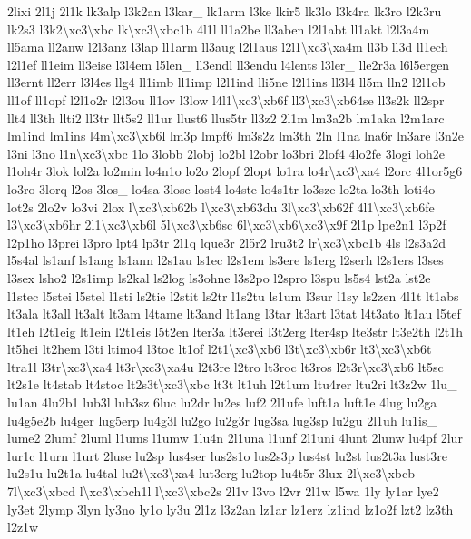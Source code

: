{2lixi 2l1j 2l1k lk3alp l3k2an l3kar\-\_\- lk1arm l3ke lkir5 lk3lo l3k4ra lk3ro l2k3ru lk2s3 l3k2\textbackslash{}xc3\textbackslash{}xbc lk\textbackslash{}xc3\textbackslash{}xbc1b 4l1l ll1a2be ll3aben l2l1abt ll1akt l2l3a4m ll5ama ll2anw l2l3anz l3lap ll1arm ll3aug l2l1aus l2l1\textbackslash{}xc3\textbackslash{}xa4m ll3b ll3d ll1ech l2l1ef ll1eim ll3eise l3l4em l5len\-\_\- ll3endl ll3endu l4lents l3ler\-\_\- lle2r3a l6l5ergen ll3ernt ll2err l3l4es llg4 ll1imb ll1imp l2l1ind lli5ne l2l1ins ll3l4 ll5m lln2 l2l1ob ll1of ll1opf l2l1o2r l2l3ou ll1ov l3low l4l1\textbackslash{}xc3\textbackslash{}xb6f ll3\textbackslash{}xc3\textbackslash{}xb64se ll3s2k ll2spr llt4 ll3th llti2 ll3tr llt5s2 ll1ur llust6 llus5tr ll3z2 2l1m lm3a2b lm1aka l2m1arc lm1ind lm1ins l4m\textbackslash{}xc3\textbackslash{}xb6l lm3p lmpf6 lm3s2z lm3th 2ln l1na lna6r ln3are l3n2e l3ni l3no l1n\textbackslash{}xc3\textbackslash{}xbc 1lo 3lobb 2lobj lo2bl l2obr lo3bri 2lof4 4lo2fe 3logi loh2e l1oh4r 3lok lol2a lo2min lo4n1o lo2o 2lopf 2lopt lo1ra lo4r\textbackslash{}xc3\textbackslash{}xa4 l2orc 4l1or5g6 lo3ro 3lorq l2os 3los\-\_\- lo4sa 3lose lost4 lo4ste lo4s1tr lo3sze lo2ta lo3th loti4o lot2s 2lo2v lo3vi 2lox l\textbackslash{}xc3\textbackslash{}xb62b l\textbackslash{}xc3\textbackslash{}xb63du 3l\textbackslash{}xc3\textbackslash{}xb62f 4l1\textbackslash{}xc3\textbackslash{}xb6fe l3\textbackslash{}xc3\textbackslash{}xb6hr 2l1\textbackslash{}xc3\textbackslash{}xb6l 5l\textbackslash{}xc3\textbackslash{}xb6sc 6l\textbackslash{}xc3\textbackslash{}xb6\textbackslash{}xc3\textbackslash{}x9f 2l1p lpe2n1 l3p2f l2p1ho l3prei l3pro lpt4 lp3tr 2l1q lque3r 2l5r2 lru3t2 lr\textbackslash{}xc3\textbackslash{}xbc1b 4ls l2s3a2d l5s4al ls1anf ls1ang ls1ann l2s1au ls1ec l2s1em ls3ere ls1erg l2serh l2s1ers l3ses l3sex lsho2 l2s1imp ls2kal ls2log ls3ohne l3s2po l2spro l3spu ls5s4 lst2a lst2e l1stec l5stei l5stel l1sti ls2tie l2stit ls2tr l1s2tu ls1um l3sur l1sy ls2zen 4l1t lt1abs lt3ala lt3all lt3alt lt3am l4tame lt3and lt1ang l3tar lt3art l3tat l4t3ato lt1au l5tef lt1eh l2t1eig lt1ein l2t1eis l5t2en lter3a lt3erei l3t2erg lter4sp lte3str lt3e2th l2t1h lt5hei lt2hem l3ti ltimo4 l3toc lt1of l2t1\textbackslash{}xc3\textbackslash{}xb6 l3t\textbackslash{}xc3\textbackslash{}xb6r lt3\textbackslash{}xc3\textbackslash{}xb6t ltra1l l3tr\textbackslash{}xc3\textbackslash{}xa4 lt3r\textbackslash{}xc3\textbackslash{}xa4u l2t3re l2tro lt3roc lt3ros l2t3r\textbackslash{}xc3\textbackslash{}xb6 lt5sc lt2s1e lt4stab lt4stoc lt2s3t\textbackslash{}xc3\textbackslash{}xbc lt3t lt1uh l2t1um ltu4rer ltu2ri lt3z2w 1lu\-\_\- lu1an 4lu2b1 lub3l lub3sz 6luc lu2dr lu2es luf2 2l1ufe luft1a luft1e 4lug lu2ga lu4g5e2b lu4ger lug5erp lu4g3l lu2go lu2g3r lug3sa lug3sp lu2gu 2l1uh lu1is\-\_\- lume2 2lumf 2luml l1ums l1umw 1lu4n 2l1una l1unf 2l1uni 4lunt 2lunw lu4pf 2lur lur1c l1urn l1urt 2luse lu2sp lus4ser lus2s1o lus2s3p lus4st lu2st lus2t3a lust3re lu2s1u lu2t1a lu4tal lu2t\textbackslash{}xc3\textbackslash{}xa4 lut3erg lu2top lu4t5r 3lux 2l\textbackslash{}xc3\textbackslash{}xbcb 7l\textbackslash{}xc3\textbackslash{}xbcd l\textbackslash{}xc3\textbackslash{}xbch1l l\textbackslash{}xc3\textbackslash{}xbc2s 2l1v l3vo l2vr 2l1w l5wa 1ly ly1ar lye2 ly3et 2lymp 3lyn ly3no ly1o ly3u 2l1z l3z2an lz1ar lz1erz lz1ind lz1o2f lzt2 lz3th l2z1w }

